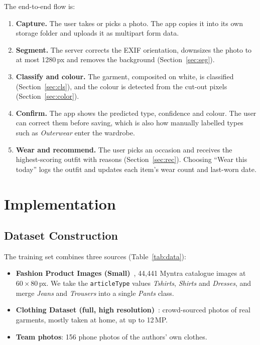 \documentclass[conference]{IEEEtran}
\begin{document}
The end-to-end flow is:
\begin{enumerate}
  \item \textbf{Capture.} The user takes or picks a photo. The app copies it into its own storage folder and uploads it as multipart form data.
  \item \textbf{Segment.} The server corrects the EXIF orientation, downsizes the photo to at most 1280\,px and removes the background (Section~\ref{sec:seg}).
  \item \textbf{Classify and colour.} The garment, composited on white, is classified (Section~\ref{sec:cls}), and the colour is detected from the cut-out pixels (Section~\ref{sec:color}).
  \item \textbf{Confirm.} The app shows the predicted type, confidence and colour. The user can correct them before saving, which is also how manually labelled types such as \emph{Outerwear} enter the wardrobe.
  \item \textbf{Wear and recommend.} The user picks an occasion and receives the highest-scoring outfit with reasons (Section~\ref{sec:rec}). Choosing ``Wear this today'' logs the outfit and updates each item's wear count and last-worn date.
\end{enumerate}

\section{Implementation}
\subsection{Dataset Construction}\label{sec:data}
The training set combines three sources (Table~\ref{tab:data}):
\begin{itemize}
  \item \textbf{Fashion Product Images (Small)}~\cite{kaggleFashion}, 44{,}441 Myntra catalogue images at $60{\times}80$\,px. We take the \texttt{articleType} values \emph{Tshirts}, \emph{Shirts} and \emph{Dresses}, and merge \emph{Jeans} and \emph{Trousers} into a single \emph{Pants} class.
  \item \textbf{Clothing Dataset (full, high resolution)}~\cite{grigorev2020clothing}: crowd-sourced photos of real garments, mostly taken at home, at up to 12\,MP.
  \item \textbf{Team photos}: 156 phone photos of the authors' own clothes.
\end{itemize}
\end{document}
